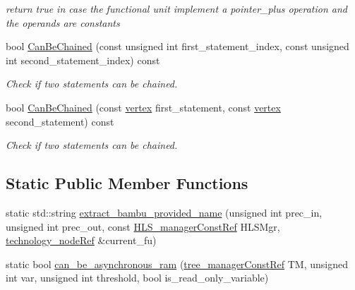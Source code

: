 \begin{DoxyCompactItemize}
\begin{DoxyCompactList}\small\item\em return true in case the functional unit implement a pointer\+\_\+plus operation and the operands are constants \end{DoxyCompactList}\item 
bool \hyperlink{classAllocationInformation_ab38098c58dccc26bf6c3b8b948376911}{Can\+Be\+Chained} (const unsigned int first\+\_\+statement\+\_\+index, const unsigned int second\+\_\+statement\+\_\+index) const
\begin{DoxyCompactList}\small\item\em Check if two statements can be chained. \end{DoxyCompactList}\item 
bool \hyperlink{classAllocationInformation_a25d00c0d07725618b0e3e9de287b4fc9}{Can\+Be\+Chained} (const \hyperlink{graph_8hpp_abefdcf0544e601805af44eca032cca14}{vertex} first\+\_\+statement, const \hyperlink{graph_8hpp_abefdcf0544e601805af44eca032cca14}{vertex} second\+\_\+statement) const
\begin{DoxyCompactList}\small\item\em Check if two statements can be chained. \end{DoxyCompactList}\end{DoxyCompactItemize}
\subsection*{Static Public Member Functions}
\begin{DoxyCompactItemize}
\item 
static std\+::string \hyperlink{classAllocationInformation_a8b75a35aaa38a9c7c46a78ac477c1fea}{extract\+\_\+bambu\+\_\+provided\+\_\+name} (unsigned int prec\+\_\+in, unsigned int prec\+\_\+out, const \hyperlink{hls__manager_8hpp_a1b481383e3beabc89bd7562ae672dd8c}{H\+L\+S\+\_\+manager\+Const\+Ref} H\+L\+S\+Mgr, \hyperlink{technology__node_8hpp_a33dd193b7bd6b987bf0d8a770a819fa7}{technology\+\_\+node\+Ref} \&current\+\_\+fu)
\item 
static bool \hyperlink{classAllocationInformation_a3f008043819189ad03f0d1d8c510c626}{can\+\_\+be\+\_\+asynchronous\+\_\+ram} (\hyperlink{tree__manager_8hpp_a792e3f1f892d7d997a8d8a4a12e39346}{tree\+\_\+manager\+Const\+Ref} TM, unsigned int var, unsigned int threshold, bool is\+\_\+read\+\_\+only\+\_\+variable)
\end{DoxyCompactItemize}
